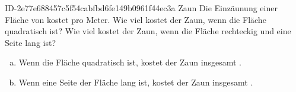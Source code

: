 \begin{exercise}
      {ID-2e77e688457c5f54cabfbd6fe149b0961f44ec3a}
      {Zaun}
  \ifproblem\problem
    Die Einzäunung einer Fläche von  kostet  pro Meter.
    Wie viel kostet der Zaun, wenn die Fläche quadratisch ist?
    Wie viel kostet der Zaun, wenn die Fläche rechteckig und
    eine Seite  lang ist?
  \fi
  \ifoutcome\outcome
    \begin{enumerate}[a)]
      \item Wenn die Fläche quadratisch ist,
            kostet der Zaun insgesamt .
      \item Wenn eine Seite der Fläche  lang ist,
            kostet der Zaun insgesamt .
    \end{enumerate}
  \fi
\end{exercise}
